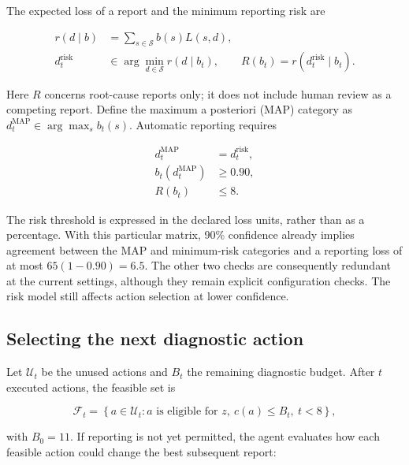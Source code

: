 \documentclass{article}
\begin{document}
The expected loss of a report and the minimum reporting risk are

\begin{align}
r(d\mid b)&=\sum_{s\in\mathcal{S}}b(s)L(s,d),
\label{eq:agent_report_loss}\\
d_t^{\mathrm{risk}}&\in\arg\min_{d\in\mathcal{S}}r(d\mid b_t),
\qquad
R(b_t)=r(d_t^{\mathrm{risk}}\mid b_t).
\label{eq:agent_bayes_risk}
\end{align}

Here $R$ concerns root-cause reports only; it does not include human review
as a competing report. Define the maximum a posteriori (MAP) category as
$d_t^{\mathrm{MAP}}\in\arg\max_s b_t(s)$. Automatic reporting requires

\begin{equation}
\begin{aligned}
d_t^{\mathrm{MAP}}&=d_t^{\mathrm{risk}},\\
b_t(d_t^{\mathrm{MAP}})&\geq 0.90,\\
R(b_t)&\leq 8.
\end{aligned}
\label{eq:agent_reporting_gate}
\end{equation}

The risk threshold is expressed in the declared loss units, rather than as
a percentage. With this particular matrix, 90\% confidence already implies
agreement between the MAP and minimum-risk categories and a reporting loss
of at most $65(1-0.90)=6.5$. The other two checks are consequently redundant
at the current settings, although they remain explicit configuration
checks. The risk model still affects action selection at lower confidence.

\subsection{Selecting the next diagnostic action}

Let $\mathcal{U}_t$ be the unused actions and $B_t$ the remaining diagnostic
budget. After $t$ executed actions, the feasible set is

\begin{equation}
\mathcal{F}_t=
\left\{a\in\mathcal{U}_t:
a\text{ is eligible for }z,\ c(a)\leq B_t,\ t<8\right\},
\label{eq:agent_feasible_actions}
\end{equation}

with $B_0=11$. If reporting is not yet permitted, the agent evaluates how
each feasible action could change the best subsequent report:
\end{document}

